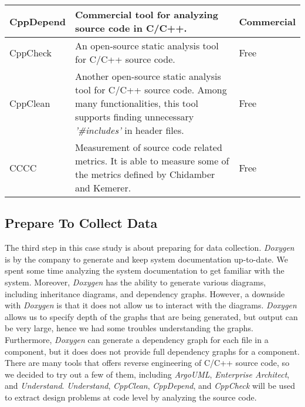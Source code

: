 \begin{table}[ht!]
\begin{tabular}{|l|p{5cm}|l}
		CppDepend & Commercial tool for analyzing source code in C/C++. & Commercial \\ \hline

		CppCheck & An open-source static analysis tool for C/C++ source code. & Free \\ \hline

		CppClean & Another open-source static analysis tool for C/C++ source code. Among many functionalities, this tool supports finding unnecessary \textit{'\#includes'} in header files. & Free \\ \hline

		CCCC & Measurement of source code related metrics. It is able to measure some of the metrics defined by Chidamber and Kemerer\cite{chidamber1994metrics}. & Free \\ \hline
	\end{tabular}
\end{table}








\subsection{Prepare To Collect Data}
The third step in this case study is about preparing for data collection. \textit{Doxygen} is by the company to generate and keep system documentation up-to-date. We spent some time analyzing the system documentation to get familiar with the system. Moreover, \textit{Doxygen} has the ability to generate various diagrams, including inheritance diagrams, and dependency graphs. However, a downside with \textit{Doxygen} is that it does not allow us to interact with the diagrams. \textit{Doxygen} allows us to specify depth of the graphs that are being generated, but output can be very large, hence we had some troubles understanding the graphs. Furthermore, \textit{Doxygen} can generate a dependency graph for each file in a component, but it does does not provide full dependency graphs for a component. There are many tools that offers reverse engineering of C/C++ source code, so we decided to try out a few of them, including \textit{ArgoUML}, \textit{Enterprise Architect}, and \textit{Understand}. \textit{Understand}, \textit{CppClean}, \textit{CppDepend}, and \textit{CppCheck} will be used to extract design problems at code level by analyzing the source code. 


